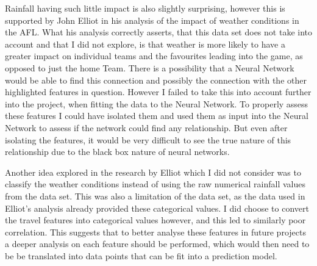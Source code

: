 \documentclass{imc-inf}
\begin{document}
	Rainfall having such little impact is also slightly surprising, however this is supported by John Elliot \cite{website:AFL_Weather} in his analysis of the impact of weather conditions in the AFL. What his analysis correctly asserts, that this data set does not take into account and that I did not explore, is that weather is more likely to have a greater impact on individual teams and the favourites leading into the game, as opposed to just the home Team. There is a possibility that a Neural Network would be able to find this connection and possibly the connection with the other highlighted features in question. However I failed to take this into account further into the project, when fitting the data to the Neural Network. To properly assess these features I could have isolated them and used them as input into the Neural Network to assess if the network could find any relationship. But even after isolating the features, it would be very difficult to see the true nature of this relationship due to the black box nature of neural networks.
	
	Another idea explored in the research by Elliot which I did not consider was to classify the weather conditions instead of using the raw numerical rainfall values from the data set. This was also a limitation of the data set, as the data used in Elliot's analysis already provided these categorical values. I did choose to convert the travel features into categorical values however, and this led to similarly poor correlation. This suggests that to better analyse these features in future projects a deeper analysis on each feature should be performed, which would then need to be be translated into data points that can be fit into a prediction model.
	
\end{document}
